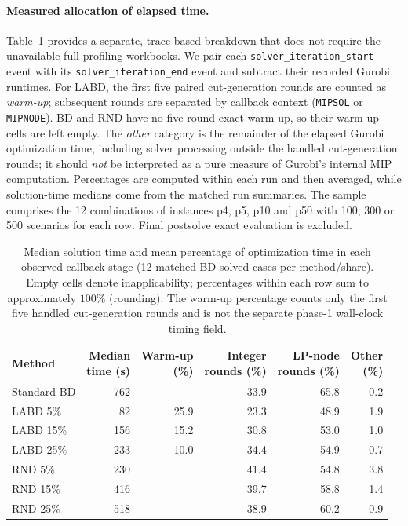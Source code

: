 \paragraph{Measured allocation of elapsed time.}
Table~\ref{tab:trace-time-share} provides a separate, trace-based breakdown that does not require the unavailable full profiling workbooks. We pair each \texttt{solver\_iteration\_start} event with its \texttt{solver\_iteration\_end} event and subtract their recorded Gurobi runtimes. For LABD, the first five paired cut-generation rounds are counted as \emph{warm-up}; subsequent rounds are separated by callback context (\texttt{MIPSOL} or \texttt{MIPNODE}). BD and RND have no five-round exact warm-up, so their warm-up cells are left empty. The \emph{other} category is the remainder of the elapsed Gurobi optimization time, including solver processing outside the handled cut-generation rounds; it should \emph{not} be interpreted as a pure measure of Gurobi's internal MIP computation. Percentages are computed within each run and then averaged, while solution-time medians come from the matched run summaries. The sample comprises the 12 combinations of instances p4, p5, p10 and p50 with 100, 300 or 500 scenarios for each row. Final postsolve exact evaluation is excluded.

\begin{table}[ht]
\centering
\caption{Median solution time and mean percentage of optimization time in each observed callback stage (12 matched BD-solved cases per method/share). Empty cells denote inapplicability; percentages within each row sum to approximately $100\%$ (rounding). The warm-up percentage counts only the first five handled cut-generation rounds and is not the separate phase-1 wall-clock timing field.}
\label{tab:trace-time-share}
\scriptsize
\setlength{\tabcolsep}{4pt}
\begin{tabular}{lrrrrr}
\toprule
Method & \shortstack{Median\\time (s)} & \shortstack{Warm-up\\(\%)} & \shortstack{Integer\\rounds (\%)} & \shortstack{LP-node\\rounds (\%)} & \shortstack{Other\\(\%)}\\
\midrule
Standard BD & 762 & & 33.9 & 65.8 & 0.2\\
LABD 5\% & 82 & 25.9 & 23.3 & 48.9 & 1.9\\
LABD 15\% & 156 & 15.2 & 30.8 & 53.0 & 1.0\\
LABD 25\% & 233 & 10.0 & 34.4 & 54.9 & 0.7\\
RND 5\% & 230 & & 41.4 & 54.8 & 3.8\\
RND 15\% & 416 & & 39.7 & 58.8 & 1.4\\
RND 25\% & 518 & & 38.9 & 60.2 & 0.9\\
\bottomrule
\end{tabular}
\end{table}


